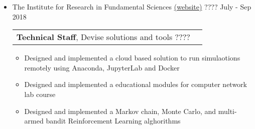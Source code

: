 \documentclass[a4paper,10pt]{article} %
\begin{document}
\begin{itemize}
\begin{itemize}
	 	\item 
	 	\textcolor{blue(ryb)}{The Institute for Research in Fundamental Sciences} \href{http://cs.ipm.ac.ir}{(website)} ???? \hfill July - Sep 2018 \\
	 	\begin{tabular}{lr}
	 		{\bf Technical Staff}, Devise solutions and tools ????& \\
	 	\end{tabular}
	 	\begin{itemize}
	 		\item
	 		Designed and implemented a cloud based solution to run simulaotions remotely using Anaconda, JupyterLab and Docker
	 		\item
	 		Designed and implemented a educational modules for computer network lab course 
	 		\item
	 		Designed and implemented a Markov chain, Monte Carlo, and multi-armed bandit Reinforcement Learning alghorithms  \\
	 	\end{itemize}
	 	
	 \end{itemize}
\end{itemize}
\end{document}
